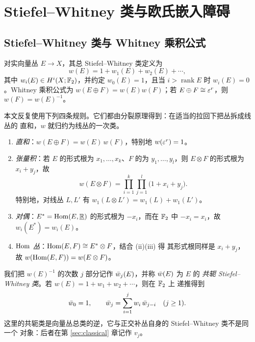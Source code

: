 \section{Stiefel--Whitney 类与欧氏嵌入障碍}
\label{sec:sw}

\subsection{Stiefel--Whitney 类与 Whitney 乘积公式}

对实向量丛 $E\to X$，其总 Stiefel--Whitney 类定义为
\begin{equation*}
  w(E)=1+w_1(E)+w_2(E)+\cdots,
\end{equation*}
其中 $w_i(E)\in H^{i}(X;\mathbb{F}_2)$，并约定 $w_0(E)=1$，且当
$i>\operatorname{rank}E$ 时 $w_i(E)=0$。Whitney 乘积公式为
$w(E\oplus F)=w(E)w(F)$；若 $E\oplus F\cong\varepsilon^{r}$，则 $w(F)=w(E)^{-1}$。

本文反复使用下列四条规则。它们都由分裂原理得到：在适当的拉回下把丛拆成线丛的
直和，$w$ 就归约为线丛的一次类。

\begin{enumerate}[label=(\roman*),leftmargin=2.4em,itemsep=0.25em]
  \item \emph{直和}：$w(E\oplus F)=w(E)\,w(F)$，特别地 $w(\varepsilon^{r})=1$。
  \item \emph{张量积}：若 $E$ 的形式根为 $x_1,\dots,x_k$、$F$ 的为
        $y_1,\dots,y_l$，则 $E\otimes F$ 的形式根为 $x_i+y_j$，故
        \begin{equation}
          w(E\otimes F)=\prod_{i=1}^{k}\prod_{j=1}^{l}\bigl(1+x_i+y_j\bigr).
          \label{eq:tensor}
        \end{equation}
        特别地，对线丛 $L,L'$ 有 $w_1(L\otimes L')=w_1(L)+w_1(L')$。
  \item \emph{对偶}：$E^{*}=\operatorname{Hom}(E,\underline{\mathbb{R}})$ 的形式根为 $-x_i$，而在
        $\mathbb{F}_2$ 中 $-x_i=x_i$，故 $w_i(E^{*})=w_i(E)$。
  \item \emph{$\operatorname{Hom}$ 丛}：$\operatorname{Hom}(E,F)\cong E^{*}\otimes F$，结合 (ii)(iii) 得
        其形式根同样是 $x_i+y_j$，故
        $w(\operatorname{Hom}(E,F))=w(E\otimes F)$。
\end{enumerate}

我们把 $w(E)^{-1}$ 的次数 $j$ 部分记作 $\bar w_j(E)$，并称 $\bar w(E)$ 为 $E$ 的
\emph{共轭 Stiefel--Whitney 类}。若 $w(E)=1+w_1+w_2+\cdots$，则在 $\mathbb{F}_2$ 上
递推得到
\begin{equation*}
  \bar w_0=1,
  \qquad
  \bar w_j=\sum_{i=1}^{j} w_i\,\bar w_{j-i}\quad (j\ge 1).
\end{equation*}
这里的共轭类是向量丛总类的逆，它与正交补丛自身的 Stiefel--Whitney 类不是同一个
对象：后者在第 \ref{sec:classical} 章记作 $v_j$。

